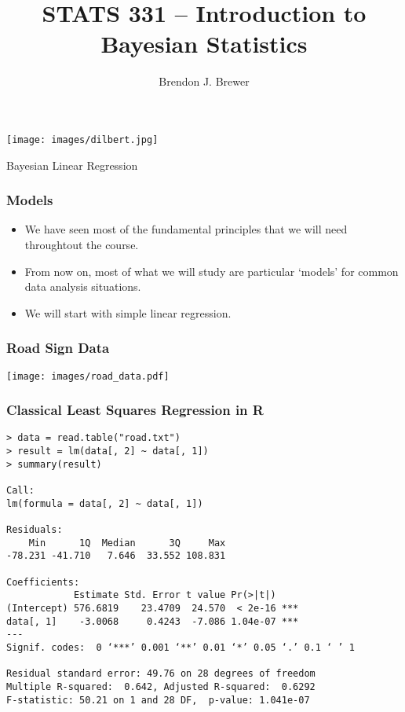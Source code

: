 \documentclass{beamer}
\author{Brendon J. Brewer}
\title{STATS 331 -- Introduction to Bayesian Statistics}
\institute{The University of Auckland}
\date{}
\begin{document}
\frame{\titlepage}

\begin{frame}
\centering
\texttt{[image: images/dilbert.jpg]}

\end{frame}



\begin{frame}
\centering
\large
Bayesian Linear Regression

\end{frame}


\begin{frame}
\frametitle{Models}
\begin{itemize}
\item We have seen most of the fundamental principles that we will need
throughtout the course.\pause
\item From now on, most of what we will study are particular `models'
for common data analysis situations.\pause
\item We will start with simple linear regression.
\end{itemize}

\end{frame}



\begin{frame}
\frametitle{Road Sign Data}
\centering
\texttt{[image: images/road\_data.pdf]}
\end{frame}


\begin{frame}[fragile]
\frametitle{Classical Least Squares Regression in R}
\tiny
\begin{verbatim}
> data = read.table("road.txt")
> result = lm(data[, 2] ~ data[, 1])
> summary(result)

Call:
lm(formula = data[, 2] ~ data[, 1])

Residuals:
    Min      1Q  Median      3Q     Max 
-78.231 -41.710   7.646  33.552 108.831 

Coefficients:
            Estimate Std. Error t value Pr(>|t|)    
(Intercept) 576.6819    23.4709  24.570  < 2e-16 ***
data[, 1]    -3.0068     0.4243  -7.086 1.04e-07 ***
---
Signif. codes:  0 ‘***’ 0.001 ‘**’ 0.01 ‘*’ 0.05 ‘.’ 0.1 ‘ ’ 1

Residual standard error: 49.76 on 28 degrees of freedom
Multiple R-squared:  0.642,	Adjusted R-squared:  0.6292 
F-statistic: 50.21 on 1 and 28 DF,  p-value: 1.041e-07
\end{verbatim}

\end{frame}
\end{document}
